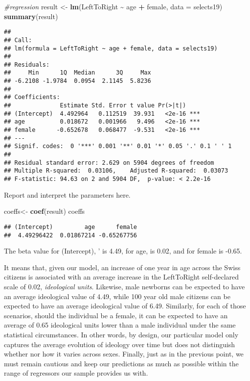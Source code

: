 \documentclass[
]{book}
\newenvironment{Shaded}{\begin{snugshade}}{\end{snugshade}}
\newcommand{\AttributeTok}[1]{\textcolor[rgb]{0.13,0.29,0.53}{#1}}
\newcommand{\CommentTok}[1]{\textcolor[rgb]{0.56,0.35,0.01}{\textit{#1}}}
\newcommand{\FunctionTok}[1]{\textcolor[rgb]{0.13,0.29,0.53}{\textbf{#1}}}
\newcommand{\NormalTok}[1]{#1}
\newcommand{\OtherTok}[1]{\textcolor[rgb]{0.56,0.35,0.01}{#1}}
\newcommand{\SpecialCharTok}[1]{\textcolor[rgb]{0.81,0.36,0.00}{\textbf{#1}}}
\begin{document}
\begin{Shaded}
\begin{Highlighting}[]
\CommentTok{\#regression}
\NormalTok{result }\OtherTok{\textless{}{-}} \FunctionTok{lm}\NormalTok{(LeftToRight }\SpecialCharTok{\textasciitilde{}}\NormalTok{ age }\SpecialCharTok{+}\NormalTok{ female, }\AttributeTok{data =}\NormalTok{ selects19)}
\FunctionTok{summary}\NormalTok{(result)}
\end{Highlighting}
\end{Shaded}

\begin{verbatim}
## 
## Call:
## lm(formula = LeftToRight ~ age + female, data = selects19)
## 
## Residuals:
##     Min      1Q  Median      3Q     Max 
## -6.2108 -1.9784  0.0954  2.1145  5.8236 
## 
## Coefficients:
##              Estimate Std. Error t value Pr(>|t|)    
## (Intercept)  4.492964   0.112519  39.931   <2e-16 ***
## age          0.018672   0.001966   9.496   <2e-16 ***
## female      -0.652678   0.068477  -9.531   <2e-16 ***
## ---
## Signif. codes:  0 '***' 0.001 '**' 0.01 '*' 0.05 '.' 0.1 ' ' 1
## 
## Residual standard error: 2.629 on 5904 degrees of freedom
## Multiple R-squared:  0.03106,    Adjusted R-squared:  0.03073 
## F-statistic: 94.63 on 2 and 5904 DF,  p-value: < 2.2e-16
\end{verbatim}

Report and interpret the parameters here.

\begin{Shaded}
\begin{Highlighting}[]
\NormalTok{coeffs}\OtherTok{\textless{}{-}} \FunctionTok{coef}\NormalTok{(result)}
\NormalTok{coeffs}
\end{Highlighting}
\end{Shaded}

\begin{verbatim}
## (Intercept)         age      female 
##  4.49296422  0.01867214 -0.65267756
\end{verbatim}

The beta value for (Intercept), ' is 4.49, for age, is 0.02, and for female is -0.65.

It means that, given our model, an increase of one year in age across the Swiss citizens is associated with an average increase in the LeftToRight self-declared scale of 0.02, \emph{ideological units}. Likewise, male newborns can be expected to have an average ideological value of 4.49, while 100 year old male citizens can be expected to have an average ideological value of 6.49. Similarly, for each of those scenarios, should the individual be a female, it can be expected to have an average of 0.65 ideological units lower than a male individual under the same statistical circumstances. In other words, by design, our particular model only captures the average evolution of ideology over time but does not distinguish whether nor how it varies across sexes. Finally, just as in the previous point, we must remain cautious and keep our predictions as much as possible within the range of regressors our sample provides us with.
\end{document}
